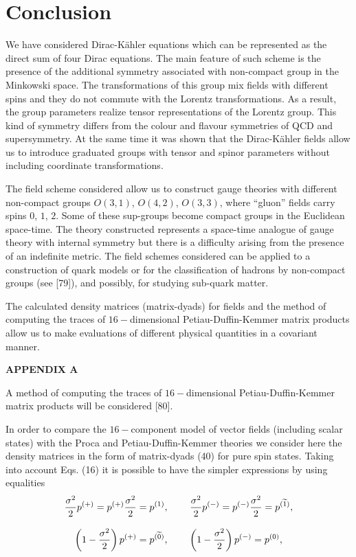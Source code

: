 \documentclass[a4paper,12pt]{article}
\begin{document}
\section{Conclusion}

We have considered Dirac-K\"ahler equations which can be represented as the
direct sum of four Dirac equations. The main feature of such scheme is the
presence of the additional symmetry associated with non-compact group in the
Minkowski space. The transformations of this group mix fields with different
spins and they do not commute with the Lorentz transformations. As a result,
the group parameters realize tensor representations of the Lorentz group.
This kind of symmetry differs from the colour and flavour symmetries of QCD
and supersymmetry. At the same time it was shown that the Dirac-K\"ahler
fields allow us to introduce graduated groups with tensor and spinor
parameters without including coordinate transformations.

The field scheme considered allow us to construct gauge theories
with different non-compact groups $O(3,1)$, $O(4,2)$, $O(3,3)$,
where ``gluon'' fields carry spins $0$, $1$, $2$. Some of these
sup-groups become compact groups in the Euclidean space-time. The
theory constructed represents a space-time analogue of gauge
theory with internal symmetry but there is a difficulty arising
from the presence of an indefinite metric. The field schemes
considered can be applied to a construction of quark models or for
the classification of hadrons by non-compact groups (see [79]),
and possibly, for studying sub-quark matter.

The calculated density matrices (matrix-dyads) for fields and the method of
computing the traces of $16-$dimensional Petiau-Duffin-Kemmer matrix
products allow us to make evaluations of different physical quantities in a
covariant manner.

\begin{center}
{\bf APPENDIX A}
\end{center}

A method of computing the traces of $16-$dimensional
Petiau-Duffin-Kemmer matrix products will be considered [80].

In order to compare the $16-$component model of vector fields (including
scalar states) with the Proca and Petiau-Duffin-Kemmer theories we consider
here the density matrices in the form of matrix-dyads (40) for pure spin
states. Taking into account Eqs. (16) it is possible to have the simpler
expressions by using equalities
\[
\frac{\sigma ^2}2p^{(+)}=p^{(+)}\frac{\sigma ^2}2=p^{(1)} ,
\hspace{0.3in}\frac{ \sigma ^2}2p^{(-)}=p^{(-)}\frac{\sigma
^2}2=p^{(\widetilde{1})} ,
\]
\vspace{-8mm}
\begin{equation}  \label{137}
\end{equation}
\vspace{-8mm}
\[
 \left( 1-\frac{\sigma ^2}2\right)
p^{(+)}=p^{(\widetilde{0})} ,\hspace{0.3in} \left( 1-\frac{\sigma
^2}2\right) p^{(-)}=p^{(0)} ,
\]
\end{document}
